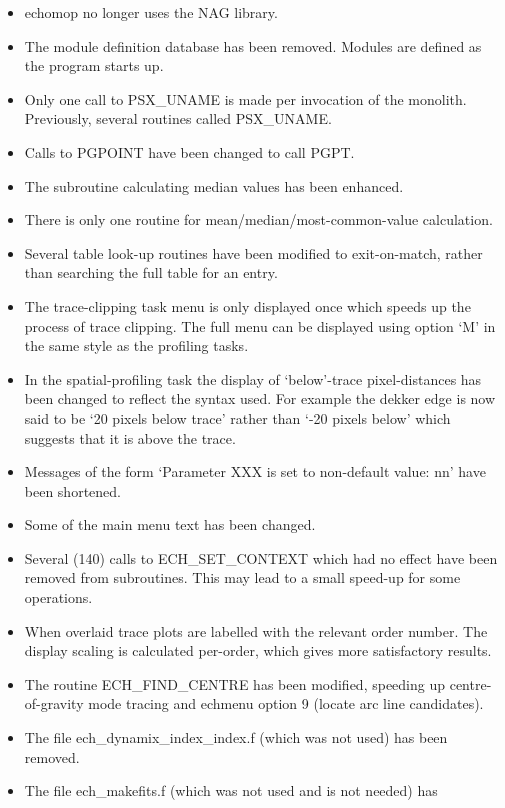 \begin{itemize}
\item {\sc echomop} no longer uses the NAG library.
\item The module definition database has been removed.  Modules are defined
   as the program starts up.
\item Only one call to PSX\_UNAME is made per invocation of the monolith.
   Previously, several routines called PSX\_UNAME.
\item Calls to PGPOINT have been changed to call PGPT.
\item The subroutine calculating median values has been enhanced.
\item There is only one routine for mean/median/most-common-value
   calculation.
\item Several table look-up routines have been modified to exit-on-match,
   rather than searching the full table for an entry.
\item The trace-clipping task menu is only displayed once which speeds
   up the process of trace clipping.  The full menu can be displayed
   using option `M' in the same style as the profiling tasks.
\item In the spatial-profiling task the display of `below'-trace
   pixel-distances has been changed to reflect the syntax used.  For
   example the dekker edge is now said to be `20 pixels below trace'
   rather than `-20 pixels below' which suggests that it is above the
   trace.
\item Messages of the form `Parameter XXX is set to non-default value: nn'
   have been shortened.
\item Some of the main menu text has been changed.
\item Several (140) calls to ECH\_SET\_CONTEXT which had no effect have been
   removed from subroutines.  This may lead to a small speed-up for
   some operations.
\item When  overlaid trace plots are
   labelled with the relevant
   order number.  The display scaling is calculated per-order, which gives
   more satisfactory results.
\item The routine ECH\_FIND\_CENTRE has been modified, speeding up
   centre-of-gravity mode tracing and echmenu option 9 (locate arc line
   candidates).
\item The file ech\_dynamix\_index\_index.f (which was not used) has been
   removed.
\item The file ech\_makefits.f (which was not used and is not needed) has

\end{itemize}
